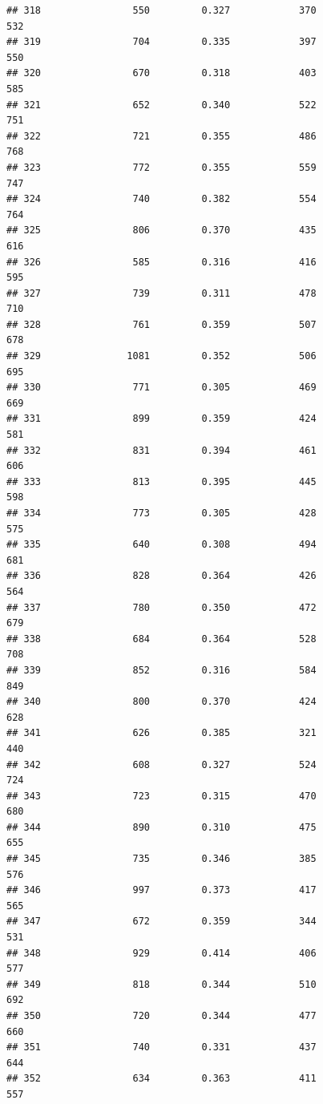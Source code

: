 \documentclass[]{book}
\begin{document}
\begin{verbatim}
## 318                550         0.327            370                 532
## 319                704         0.335            397                 550
## 320                670         0.318            403                 585
## 321                652         0.340            522                 751
## 322                721         0.355            486                 768
## 323                772         0.355            559                 747
## 324                740         0.382            554                 764
## 325                806         0.370            435                 616
## 326                585         0.316            416                 595
## 327                739         0.311            478                 710
## 328                761         0.359            507                 678
## 329               1081         0.352            506                 695
## 330                771         0.305            469                 669
## 331                899         0.359            424                 581
## 332                831         0.394            461                 606
## 333                813         0.395            445                 598
## 334                773         0.305            428                 575
## 335                640         0.308            494                 681
## 336                828         0.364            426                 564
## 337                780         0.350            472                 679
## 338                684         0.364            528                 708
## 339                852         0.316            584                 849
## 340                800         0.370            424                 628
## 341                626         0.385            321                 440
## 342                608         0.327            524                 724
## 343                723         0.315            470                 680
## 344                890         0.310            475                 655
## 345                735         0.346            385                 576
## 346                997         0.373            417                 565
## 347                672         0.359            344                 531
## 348                929         0.414            406                 577
## 349                818         0.344            510                 692
## 350                720         0.344            477                 660
## 351                740         0.331            437                 644
## 352                634         0.363            411                 557

\end{verbatim}
\end{document}

